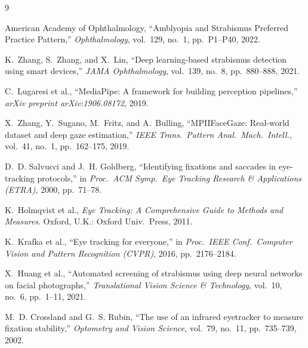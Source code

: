 \documentclass[11pt,a4paper]{article}
\begin{document}
\begin{thebibliography}{9}

American Academy of Ophthalmology, ``Amblyopia and Strabismus Preferred Practice Pattern,'' \emph{Ophthalmology}, vol.~129, no.~1, pp.~P1--P40, 2022.

K.~Zhang, S.~Zhang, and X.~Lin, ``Deep learning-based strabismus detection using smart devices,'' \emph{JAMA Ophthalmology}, vol.~139, no.~8, pp.~880--888, 2021.

C.~Lugaresi et al., ``MediaPipe: A framework for building perception pipelines,'' \emph{arXiv preprint arXiv:1906.08172}, 2019.

X.~Zhang, Y.~Sugano, M.~Fritz, and A.~Bulling, ``MPIIFaceGaze: Real-world dataset and deep gaze estimation,'' \emph{IEEE Trans.\ Pattern Anal.\ Mach.\ Intell.}, vol.~41, no.~1, pp.~162--175, 2019.

D.~D. Salvucci and J.~H. Goldberg, ``Identifying fixations and saccades in eye-tracking protocols,'' in \emph{Proc.\ ACM Symp.\ Eye Tracking Research \& Applications (ETRA)}, 2000, pp.~71--78.

K.~Holmqvist et al., \emph{Eye Tracking: A Comprehensive Guide to Methods and Measures}. Oxford, U.K.: Oxford Univ.\ Press, 2011.

K.~Krafka et al., ``Eye tracking for everyone,'' in \emph{Proc.\ IEEE Conf.\ Computer Vision and Pattern Recognition (CVPR)}, 2016, pp.~2176--2184.

X.~Huang et al., ``Automated screening of strabismus using deep neural networks on facial photographs,'' \emph{Translational Vision Science \& Technology}, vol.~10, no.~6, pp.~1--11, 2021.

M.~D. Crossland and G.~S. Rubin, ``The use of an infrared eyetracker to measure fixation stability,'' \emph{Optometry and Vision Science}, vol.~79, no.~11, pp.~735--739, 2002.

\end{thebibliography}
\end{document}
